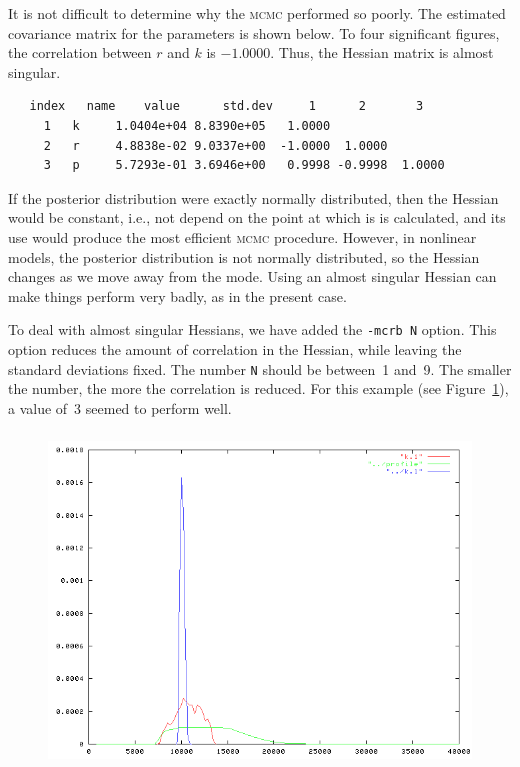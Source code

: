 \documentclass{admbmanual}
\begin{document}
It is not difficult to determine why the \textsc{mcmc} performed so poorly. The
estimated covariance matrix for the parameters is shown below. To four
significant figures, the correlation between $r$ and $k$ is $-1.0000$. Thus, the
Hessian matrix is almost singular.
\begin{lstlisting}
   index   name    value      std.dev     1      2       3
     1   k     1.0404e+04 8.8390e+05   1.0000
     2   r     4.8838e-02 9.0337e+00  -1.0000  1.0000
     3   p     5.7293e-01 3.6946e+00   0.9998 -0.9998  1.0000
\end{lstlisting}
If the posterior distribution were exactly normally distributed, then the
Hessian would be constant, i.e., not depend on the point at which is is
calculated, and its use would produce the most efficient \textsc{mcmc}
procedure. However, in nonlinear models, the posterior distribution is not
normally distributed, so the Hessian changes as we move away from the mode.
Using an almost singular Hessian can make things perform very badly, as in the
present case.

To deal with almost singular Hessians, we have added the \texttt{-mcrb N}
option.
This option reduces the amount of correlation in the Hessian, while leaving the
standard deviations fixed. The number \texttt{N} should be between~1 and~9. The
smaller the number, the more the correlation is reduced. For this example (see
Figure~\ref{fig:07}), a value of~3 seemed to perform well.
\begin{figure}[htbp]
\includegraphics[height=3.5in, width=\textwidth]{mcrb3-50K.png}
\emptycaption
\label{fig:07}
\end{figure}
\end{document}
